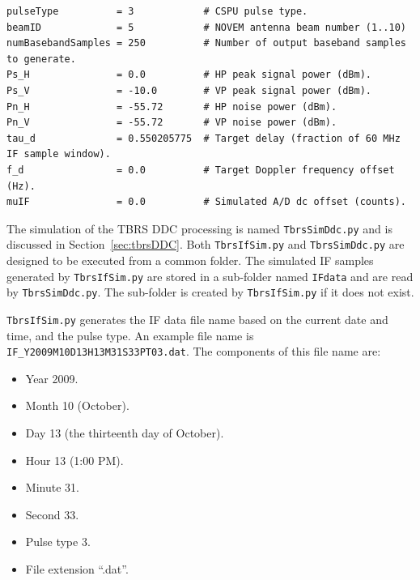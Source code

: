 \documentclass[12pt,english]{article}
\begin{document}
\scriptsize
\begin{verbatim}
pulseType          = 3            # CSPU pulse type.
beamID             = 5            # NOVEM antenna beam number (1..10)
numBasebandSamples = 250          # Number of output baseband samples to generate.
Ps_H               = 0.0          # HP peak signal power (dBm).
Ps_V               = -10.0        # VP peak signal power (dBm).
Pn_H               = -55.72       # HP noise power (dBm).
Pn_V               = -55.72       # VP noise power (dBm).
tau_d              = 0.550205775  # Target delay (fraction of 60 MHz IF sample window).
f_d                = 0.0          # Target Doppler frequency offset (Hz).
muIF               = 0.0          # Simulated A/D dc offset (counts).
\end{verbatim}
\normalsize

The simulation of the TBRS DDC processing
is named \texttt{TbrsSimDdc.py} and is discussed in
Section~\vref{sec:tbrsDDC}. Both \texttt{TbrsIfSim.py} and
\texttt{TbrsSimDdc.py} are designed to be executed from a common
folder. The simulated IF samples generated by \texttt{TbrsIfSim.py}
are stored in a sub-folder named \texttt{IFdata} and are read by
\texttt{TbrsSimDdc.py}. The sub-folder is created by
\texttt{TbrsIfSim.py} if it does not exist.

\texttt{TbrsIfSim.py} generates the IF data file name based on the
current date and time, and the pulse type. An example file name is
\texttt{IF\_Y2009M10D13H13M31S33PT03.dat}. The components of this file
name are:
\begin{itemize}

\item Year 2009.

\item Month 10 (October).

\item Day 13 (the thirteenth day of October).

\item Hour 13 (1:00 PM).

\item Minute 31.

\item Second 33.

\item Pulse type 3.

\item File extension ``.dat''.

\end{itemize}
\end{document}
